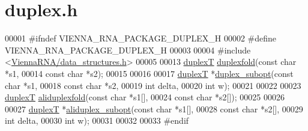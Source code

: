 \hypertarget{duplex_8h_source}{}\section{duplex.\+h}
\label{duplex_8h_source}

\begin{DoxyCode}
00001 \textcolor{preprocessor}{#ifndef VIENNA\_RNA\_PACKAGE\_DUPLEX\_H}
00002 \textcolor{preprocessor}{#define VIENNA\_RNA\_PACKAGE\_DUPLEX\_H}
00003 
00004 \textcolor{preprocessor}{#include <\mbox{\hyperlink{data__structures_8h}{ViennaRNA/data\_structures.h}}>}
00005 
00013 \mbox{\hyperlink{group__data__structures_structduplex_t}{duplexT}} \mbox{\hyperlink{duplex_8h_a5cd7d482c454fb04d4e5339c0e57d9f2}{duplexfold}}(\textcolor{keyword}{const} \textcolor{keywordtype}{char} *s1,
00014                    \textcolor{keyword}{const} \textcolor{keywordtype}{char} *s2);
00015 
00016 
00017 \mbox{\hyperlink{group__data__structures_structduplex_t}{duplexT}} *\mbox{\hyperlink{duplex_8h_ac0842c81f606e66e465c8f746a6df29c}{duplex\_subopt}}(\textcolor{keyword}{const} \textcolor{keywordtype}{char} *s1,
00018                        \textcolor{keyword}{const} \textcolor{keywordtype}{char} *s2,
00019                        \textcolor{keywordtype}{int}        delta,
00020                        \textcolor{keywordtype}{int}        w);
00021 
00022 
00023 \mbox{\hyperlink{group__data__structures_structduplex_t}{duplexT}} \mbox{\hyperlink{duplex_8h_a5702703edef4c1b705098e15263a0aaf}{aliduplexfold}}(\textcolor{keyword}{const} \textcolor{keywordtype}{char}  *s1[],
00024                       \textcolor{keyword}{const} \textcolor{keywordtype}{char}  *s2[]);
00025 
00026 
00027 \mbox{\hyperlink{group__data__structures_structduplex_t}{duplexT}} *\mbox{\hyperlink{duplex_8h_ab4549dfd6fdc7f8e370a32ec4599bae8}{aliduplex\_subopt}}(\textcolor{keyword}{const} \textcolor{keywordtype}{char}  *s1[],
00028                           \textcolor{keyword}{const} \textcolor{keywordtype}{char}  *s2[],
00029                           \textcolor{keywordtype}{int}         delta,
00030                           \textcolor{keywordtype}{int}         w);
00031 
00032 
00033 \textcolor{preprocessor}{#endif}
\end{DoxyCode}
